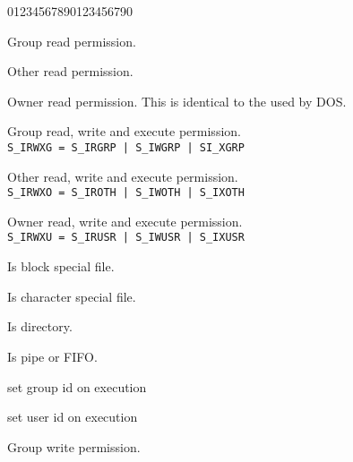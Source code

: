 \begin{Ventry2}{01234567890123456790}

\item[S\_IRGRP]
\label{item:SIRGRP}
Group read permission.

\item[S\_IROTH]
\label{item:SIROTH}
Other read permission.

\item[S\_IRUSR]
\label{item:SIRUSR}

Owner read permission. This is identical to the
 used by DOS.

\item[S\_IRWXG]
\label{item:SIRWXG}
Group read, write and execute permission.\\
\verb+S_IRWXG = S_IRGRP | S_IWGRP | SI_XGRP+

\item[S\_IRWXO]
\label{item:SIRWXO}
Other read, write and  execute permission.\\
\verb+S_IRWXO = S_IROTH | S_IWOTH | S_IXOTH+

\item[S\_IRWXU]
\label{item:SIRWXU}
Owner read, write and execute permission.\\
\verb+S_IRWXU = S_IRUSR | S_IWUSR | S_IXUSR+

\item[S\_ISBLK]
\label{item:SISBLK}

Is block special file.

\item[S\_ISCHR]
\label{item:SISCHR}

Is character special file.

\item[S\_ISDIR]
\label{item:SISDIR}

Is directory.

\item[S\_ISFIFO]
\label{item:SISFIFO}
Is pipe or FIFO.

\item[S\_ISGID]
\label{item:SISGID}
set group id on execution 

\item[S\_ISREG]
\label{item:SISREG}
set user id on execution 

\item[S\_IWGRP]
\label{item:SIWGRP}
Group write permission.


\end{Ventry2}
